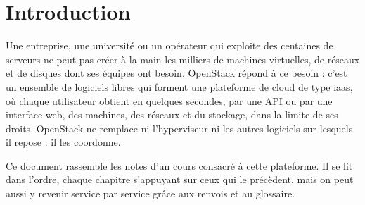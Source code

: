 
\section*{Introduction}

Une entreprise, une université ou un opérateur qui exploite des centaines de serveurs ne peut pas créer à la main les milliers de
machines virtuelles, de réseaux et de disques dont ses équipes ont besoin. OpenStack répond à ce besoin : c'est un ensemble de
logiciels libres qui forment une plateforme de cloud de type \gls{iaas}, où chaque utilisateur obtient en quelques secondes, par une
API ou par une interface web, des machines, des réseaux et du stockage, dans la limite de ses droits. OpenStack ne remplace ni
l'hyperviseur ni les autres logiciels sur lesquels il repose : il les coordonne.

Ce document rassemble les notes d'un cours consacré à cette plateforme. Il se lit dans l'ordre, chaque chapitre s'appuyant sur ceux
qui le précèdent, mais on peut aussi y revenir service par service grâce aux renvois et au glossaire.

